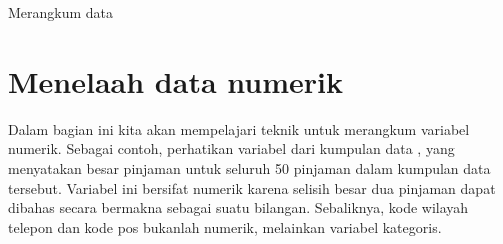 \begin{chapterpage}{Merangkum data}
  \label{summarizingData}
  \label{ch_summarizing_data}
\end{chapterpage}
\renewcommand{\chapterfolder}{ch_summarizing_data}




\section{Menelaah data numerik}
\label{numericalData}

\newcommand{\loanA}{10.90}
\newcommand{\loanB}{9.92}
\newcommand{\loanC}{26.30}
\newcommand{\loanD}{9.92}
\newcommand{\loanY}{9.43}
\newcommand{\loanZ}{6.08}
\newcommand{\loanAvg}{11.57}
\newcommand{\loanVar}{25.52}
\newcommand{\loanSD}{5.05}
\newcommand{\loanN}{50}
\newcommand{\loanMedianBelow}{9.93\%}
\newcommand{\loanMedianAbove}{9.93\%}
\newcommand{\loanMedian}{9.93\%}
\newcommand{\loanQA}{7.96}
\newcommand{\loanQC}{13.72}
\newcommand{\loanIQR}{5.76}
\newcommand{\loanAdev}{-0.67}
\newcommand{\loanBdev}{-1.65}
\newcommand{\loanCdev}{14.73}
\newcommand{\loanDdev}{-1.65}
\newcommand{\loanYdev}{-2.14}
\newcommand{\loanZdev}{-5.49}
\newcommand{\loanSmallestValue}{5.31}
\newcommand{\loanLargestValue}{26.30}


Dalam bagian ini kita akan mempelajari teknik untuk
merangkum variabel numerik.
Sebagai contoh, perhatikan variabel 
dari kumpulan data , yang menyatakan besar pinjaman
untuk seluruh 50 pinjaman dalam kumpulan data tersebut.
Variabel ini bersifat numerik karena selisih besar dua pinjaman
dapat dibahas secara bermakna sebagai suatu bilangan.
Sebaliknya, kode wilayah telepon dan kode pos bukanlah numerik,
melainkan variabel kategoris.

